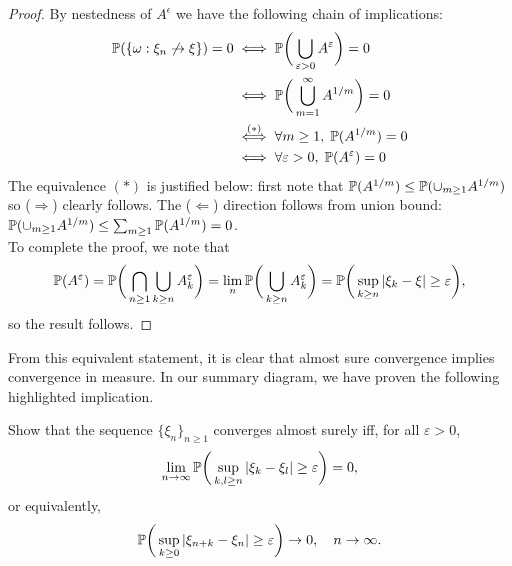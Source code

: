 \begin{proof}
By nestedness of $A^\epsilon$ we have the following chain of implications:
\begin{align*}
    \mathbb{P}(\left\{ \omega: \xi_n \not \to \xi \right \}) = 0 
    &\iff \mathbb{P} \bigg( \bigcup_{\varepsilon > 0} A^\varepsilon \bigg) = 0\\
    &\iff \mathbb{P} \bigg( \bigcup_{m=1}^\infty A^{1/m} \bigg) = 0\\
    &\overset{(*)}{\iff} \forall m \geq 1, \; \mathbb{P}(A^{1/m}) = 0\\
    &\iff \forall \varepsilon > 0, \; \mathbb{P}(A^\varepsilon) = 0
\end{align*}
The equivalence $(*)$ is justified below: first note that $\mathbb{P}(A^{1/m}) \leq \mathbb{P}(\cup_{m\geq 1} A^{1/m})$ so ($\Rightarrow$) clearly follows. The ($\Leftarrow$) direction follows from union bound: $\mathbb{P}(\cup_{m\geq 1} A^{1/m}) \leq \sum_{m\geq 1} \mathbb{P}(A^{1/m}) = 0$.\\

To complete the proof, we note that
\begin{equation*}
    \mathbb{P}(A^\varepsilon) = \mathbb{P} \bigg( \bigcap_{n \geq 1} \bigcup_{k \ge n} A_k^\varepsilon \bigg) = \lim_n \mathbb{P} \bigg( \bigcup_{k \ge n} A_k^\varepsilon \bigg) = \mathbb{P}\bigg(\sup_{k \ge n}|\xi_k - \xi| \ge \varepsilon \bigg),
\end{equation*}
so the result follows.
\end{proof}

From this equivalent statement, it is clear that almost sure convergence implies convergence in measure. In our summary diagram, we have proven the following highlighted implication.

\begin{figure} [H]
    \centering
\end{figure}

\begin{exercise} \label{ex:as_Cauchy}
Show that the sequence $\{\xi_n\}_{n\geq 1}$ converges almost surely iff, for all $\varepsilon > 0$, 
\begin{equation*}
    \lim_{n\to\infty} \mathbb{P} \bigg(\sup_{k, l \ge n} |\xi_{k} - \xi_l| \ge \varepsilon\bigg) = 0,
\end{equation*}
or equivalently,
\begin{equation*}
    \mathbb{P} \bigg(\sup_{k \ge 0} |\xi_{n+k} - \xi_n| \ge \varepsilon\bigg) \to 0, \quad n \to \infty.
\end{equation*}
\end{exercise}

